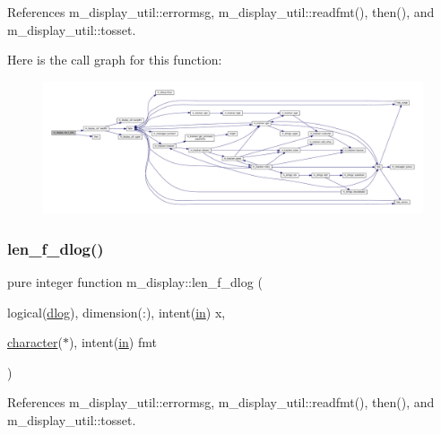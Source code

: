 References m\+\_\+display\+\_\+util\+::errormsg, m\+\_\+display\+\_\+util\+::readfmt(), then(), and m\+\_\+display\+\_\+util\+::tosset.

Here is the call graph for this function\+:
\nopagebreak
\begin{figure}[H]
\begin{center}
\leavevmode
\includegraphics[width=350pt]{namespacem__display_a6a2709cf5f243ee492f223b40c6b5143_cgraph}
\end{center}
\end{figure}
\mbox{\label{namespacem__display_a2a298a8f2faf00047152b93cd265d396}} 
\subsubsection{\texorpdfstring{len\+\_\+f\+\_\+dlog()}{len\_f\_dlog()}}
{\footnotesize\ttfamily pure integer function m\+\_\+display\+::len\+\_\+f\+\_\+dlog (\begin{DoxyParamCaption}\item[{logical(\hyperlink{namespacem__display_a8c6a3df510feabf6bc84dd0a8789f98c}{dlog}), dimension(\+:), intent(\hyperlink{M__journal_83_8txt_afce72651d1eed785a2132bee863b2f38}{in})}]{x,  }\item[{\hyperlink{option__stopwatch_83_8txt_abd4b21fbbd175834027b5224bfe97e66}{character}($\ast$), intent(\hyperlink{M__journal_83_8txt_afce72651d1eed785a2132bee863b2f38}{in})}]{fmt }\end{DoxyParamCaption})\hspace{0.3cm}{\ttfamily [private]}}



References m\+\_\+display\+\_\+util\+::errormsg, m\+\_\+display\+\_\+util\+::readfmt(), then(), and m\+\_\+display\+\_\+util\+::tosset.

